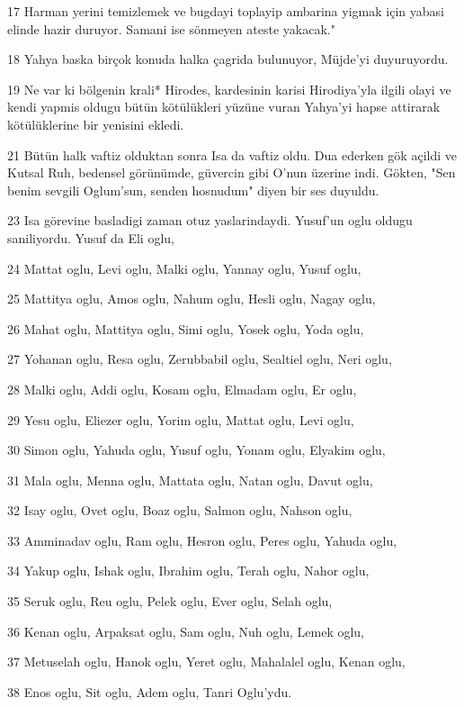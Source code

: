 \par 17 Harman yerini temizlemek ve bugdayi toplayip ambarina yigmak için yabasi elinde hazir duruyor. Samani ise sönmeyen ateste yakacak."
\par 18 Yahya baska birçok konuda halka çagrida bulunuyor, Müjde'yi duyuruyordu.
\par 19 Ne var ki bölgenin krali* Hirodes, kardesinin karisi Hirodiya'yla ilgili olayi ve kendi yapmis oldugu bütün kötülükleri yüzüne vuran Yahya'yi hapse attirarak kötülüklerine bir yenisini ekledi.
\par 21 Bütün halk vaftiz olduktan sonra Isa da vaftiz oldu. Dua ederken gök açildi ve Kutsal Ruh, bedensel görünümde, güvercin gibi O'nun üzerine indi. Gökten, "Sen benim sevgili Oglum'sun, senden hosnudum" diyen bir ses duyuldu.
\par 23 Isa görevine basladigi zaman otuz yaslarindaydi. Yusuf'un oglu oldugu saniliyordu. Yusuf da Eli oglu,
\par 24 Mattat oglu, Levi oglu, Malki oglu, Yannay oglu, Yusuf oglu,
\par 25 Mattitya oglu, Amos oglu, Nahum oglu, Hesli oglu, Nagay oglu,
\par 26 Mahat oglu, Mattitya oglu, Simi oglu, Yosek oglu, Yoda oglu,
\par 27 Yohanan oglu, Resa oglu, Zerubbabil oglu, Sealtiel oglu, Neri oglu,
\par 28 Malki oglu, Addi oglu, Kosam oglu, Elmadam oglu, Er oglu,
\par 29 Yesu oglu, Eliezer oglu, Yorim oglu, Mattat oglu, Levi oglu,
\par 30 Simon oglu, Yahuda oglu, Yusuf oglu, Yonam oglu, Elyakim oglu,
\par 31 Mala oglu, Menna oglu, Mattata oglu, Natan oglu, Davut oglu,
\par 32 Isay oglu, Ovet oglu, Boaz oglu, Salmon oglu, Nahson oglu,
\par 33 Amminadav oglu, Ram oglu, Hesron oglu, Peres oglu, Yahuda oglu,
\par 34 Yakup oglu, Ishak oglu, Ibrahim oglu, Terah oglu, Nahor oglu,
\par 35 Seruk oglu, Reu oglu, Pelek oglu, Ever oglu, Selah oglu,
\par 36 Kenan oglu, Arpaksat oglu, Sam oglu, Nuh oglu, Lemek oglu,
\par 37 Metuselah oglu, Hanok oglu, Yeret oglu, Mahalalel oglu, Kenan oglu,
\par 38 Enos oglu, Sit oglu, Adem oglu, Tanri Oglu'ydu.

